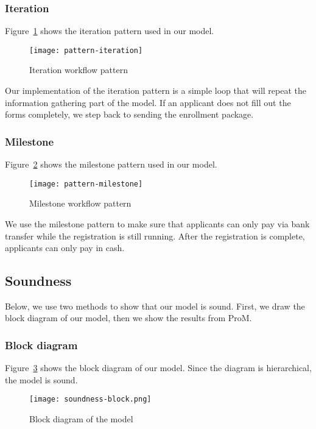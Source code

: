 \subsubsection{Iteration}

	Figure~\ref{fig:patterns:iteration} shows the iteration pattern used in our model.

	\begin{figure}[H]
		\centering
		\texttt{[image: pattern-iteration]}
		\caption{Iteration workflow pattern}
		\label{fig:patterns:iteration}
	\end{figure}

	Our implementation of the iteration pattern is a simple loop that will repeat the information gathering part of the model.
	If an applicant does not fill out the forms completely, we step back to sending the enrollment package.

\subsubsection{Milestone}

	Figure~\ref{fig:patterns:milestone} shows the milestone pattern used in our model.

	\begin{figure}[H]
		\centering
		\texttt{[image: pattern-milestone]}
		\caption{Milestone workflow pattern}
		\label{fig:patterns:milestone}
	\end{figure}

	We use the milestone pattern to make sure that applicants can only pay via bank transfer while the registration is still running.
	After the registration is complete, applicants can only pay in cash.

\subsection{Soundness}

Below, we use two methods to show that our model is sound.
First, we draw the block diagram of our model, then we show the results from ProM.

\subsubsection{Block diagram}

Figure~\ref{fig:soundness:block} shows the block diagram of our model.
Since the diagram is hierarchical, the model is sound.

\begin{figure}[H]
	\centering
	\texttt{[image: soundness-block.png]}
	\caption{Block diagram of the model}
	\label{fig:soundness:block}
\end{figure}
